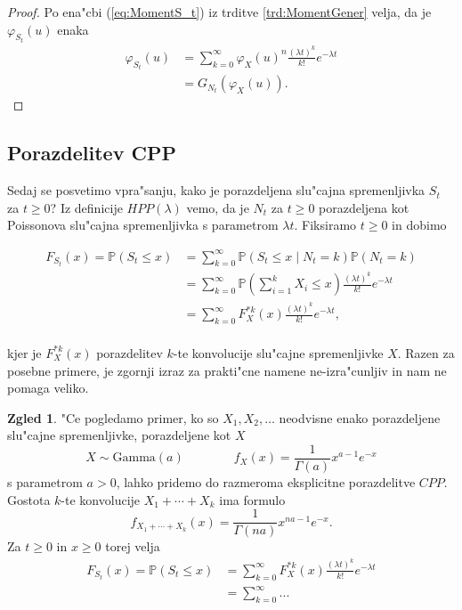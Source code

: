\documentclass[12pt, a4paper, reqno]{amsart}
\theoremstyle{definition} %
\newtheorem{zgled}[definicija]{Zgled}
\theoremstyle{plain} %
\newcommand{\Prob}{\mathbb{P}}
\newcommand{\1}{\mathds{1}}
\begin{document}
    \begin{proof}
        Po ena"cbi (\ref{eq:MomentS_t}) iz trditve \ref{trd:MomentGener} velja, da je $\varphi_{S_t}(u)$ enaka
        \begin{align*}
            \varphi_{S_t}(u) &= \sum_{k=0}^{\infty}
            \varphi_X(u)^n\frac{(\lambda t)^k}{k!}e^{-\lambda t} \\
            &= G_{N_t}\left(\varphi_X(u)\right).
        \end{align*}
    \end{proof}

    \subsection{Porazdelitev CPP}
    Sedaj se posvetimo vpra"sanju, kako je porazdeljena slu"cajna spremenljivka $S_t$ za $t\geq 0$? 
    Iz definicije $HPP(\lambda)$ vemo, da je $N_t$ za $t\geq0$ porazdeljena kot Poissonova slu"cajna 
    spremenljivka s parametrom $\lambda t$. Fiksiramo $t\geq0$ in dobimo 

    \begin{align*}
        F_{S_t}(x) = \Prob(S_t \leq x) 
        &= \sum_{k=0}^\infty \Prob(S_t \leq x \mid N_t = k)\Prob(N_t = k) \\
        & = \sum_{k=0}^\infty \Prob(\sum_{i=1}^k X_i \leq x)\frac{(\lambda t)^k}{k!}e^{-\lambda t} \\
        & = \sum_{k=0}^\infty F_X^{*k}(x)\frac{(\lambda t)^k}{k!}e^{-\lambda t}, \\
    \end{align*}

    \noindent
    kjer je $F_X^{*k}(x)$ porazdelitev $k$-te konvolucije slu"cajne spremenljivke $X$. Razen za 
    posebne primere, je zgornji izraz za prakti"cne namene ne-izra"cunljiv in nam ne pomaga veliko.
    
    \begin{zgled}
        "Ce pogledamo primer, ko so $X_1, X_2, \dots$ neodvisne enako porazdeljene slu"cajne spremenljivke,
        porazdeljene kot $X$
        \begin{equation*}
            X\sim\text{Gamma}(a) \qquad \qquad f_X(x) = \frac{1}{\Gamma(a)}x^{a-1}e^{-x}
        \end{equation*}
        s parametrom $a>0$, lahko pridemo do razmeroma eksplicitne porazdelitve $CPP$. Gostota $k$-te 
        konvolucije $X_1 + \cdots + X_k$ ima formulo
        \begin{equation*}
            f_{X_1 + \cdots + X_k}(x) = \frac{1}{\Gamma(na)}x^{na-1}e^{-x}.
        \end{equation*}
        Za $t\geq 0$ in $x \geq 0$ torej velja
        \begin{align*}
            F_{S_t}(x) = \Prob(S_t \leq x)
            &= \sum_{k=0}^\infty F_X^{*k}(x)\frac{(\lambda t)^k}{k!}e^{-\lambda t}\\
            &= \sum_{k=0}^\infty 
            ...
        \end{align*}

        

    \end{zgled}
    
\end{document}
